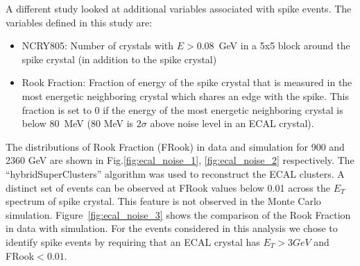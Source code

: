 A different study looked at additional variables associated with spike
events. The variables defined in this study are:
\begin{itemize}
\item NCRY805: Number of crystals with $E>0.08$~GeV in a 5x5 block around the
  spike crystal (in addition to the spike crystal)
\item Rook Fraction: Fraction of energy of the spike crystal that is measured in
  the most energetic neighboring crystal which shares an edge with the spike. This
  fraction is set to $0$ if the energy of the most energetic neighboring
  crystal is below $80$~MeV (80 MeV is $2\sigma$ above noise level in an
  ECAL crystal).
\end{itemize}

The distributions of Rook Fraction (FRook) in data and simulation for
900 and 2360 GeV are shown in Fig.\ref{fig:ecal_noise_1},
\ref{fig:ecal_noise_2} respectively. The ``hybridSuperClusters''
algorithm was used to reconstruct the ECAL clusters. A distinct set of events can
be observed at FRook values below 0.01 across the $E_T$ spectrum of
spike crystal. This feature is not observed in the Monte Carlo
simulation. Figure~\ref{fig:ecal_noise_3} shows the comparison of the
Rook Fraction in data with simulation. For the events considered in this
analysis we chose to identify spike events by requiring that an ECAL
crystal has $E_T>3GeV$ and FRook$<0.01$.


